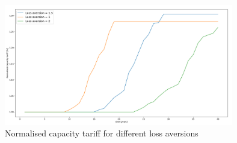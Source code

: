 \noindent
\newline
\begin{figure}[h!]
    \centering
    \includegraphics[width=10cm]{AppendixA/CapTarloss.PNG}
    \caption{Normalised capacity tariff for different loss aversions}
    \label{fig:L}
\end{figure}
\newpage

